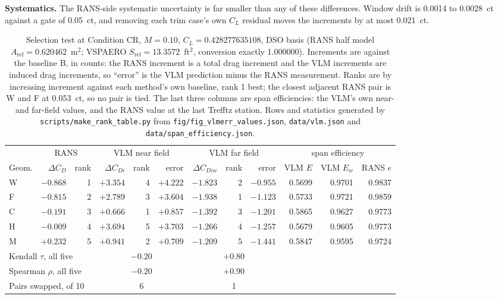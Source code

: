 \textbf{Systematics.} The RANS-side systematic uncertainty is far smaller than any of these
differences. Window drift is
0.0014 to 0.0028~ct against a gate of 0.05~ct, and removing each trim case's own $C_L$ residual
moves the increments by at most 0.021~ct.

\begin{table}[htbp]
  \centering
  \scriptsize
  \setlength{\tabcolsep}{3.5pt}
  \caption{Selection test at Condition CR, $M = 0.10$, $C_L = 0.428277635108$, DSO basis (RANS
  half model $A_\mathrm{ref} = 0.620462$~m$^2$; VSPAERO $S_\mathrm{ref} = 13.3572$~ft$^2$,
  conversion exactly 1.000000). Increments are against the baseline B, in counts: the RANS
  increment is a total drag increment and the VLM increments are induced drag increments, so
  ``error'' is the VLM prediction minus the RANS measurement. Ranks are by increasing increment
  against each method's own baseline, rank 1 best; the closest adjacent RANS pair is W and F at $0.053$~ct, so no pair is tied. The last
  three columns are span efficiencies: the VLM's own near- and far-field values, and the RANS
  value at the last Trefftz station. Rows and statistics generated by
  \texttt{scripts/make\_rank\_table.py} from \texttt{fig/fig\_vlmerr\_values.json},
  \texttt{data/vlm.json} and \texttt{data/span\_efficiency.json}.}
  \label{tab:lo:selection}
  \begin{tabular}{lrrrrrrrrrrr}
    \toprule
     & \multicolumn{2}{c}{RANS} & \multicolumn{3}{c}{VLM near field} &
       \multicolumn{3}{c}{VLM far field} & \multicolumn{3}{c}{span efficiency} \\
    \cmidrule(lr){2-3}\cmidrule(lr){4-6}\cmidrule(lr){7-9}\cmidrule(lr){10-12}
    Geom. & $\Delta C_D$ & rank & $\Delta C_{Di}$ & rank & error & $\Delta C_{Diw}$ & rank & error &
      VLM $E$ & VLM $E_w$ & RANS $e$ \\
    \midrule
    W & $-0.868$ & 1 & $+3.354$ & 4 & $+4.222$ & $-1.823$ & 2 & $-0.955$ & 0.5699 & 0.9701 & 0.9837 \\
    F & $-0.815$ & 2 & $+2.789$ & 3 & $+3.604$ & $-1.938$ & 1 & $-1.123$ & 0.5733 & 0.9721 & 0.9859 \\
    C & $-0.191$ & 3 & $+0.666$ & 1 & $+0.857$ & $-1.392$ & 3 & $-1.201$ & 0.5865 & 0.9627 & 0.9773 \\
    H & $-0.009$ & 4 & $+3.694$ & 5 & $+3.703$ & $-1.266$ & 4 & $-1.257$ & 0.5679 & 0.9605 & 0.9773 \\
    M & $+0.232$ & 5 & $+0.941$ & 2 & $+0.709$ & $-1.209$ & 5 & $-1.441$ & 0.5847 & 0.9595 & 0.9724 \\
    \midrule
    \multicolumn{3}{l}{Kendall $\tau$, all five}  & \multicolumn{3}{c}{$-0.20$} & \multicolumn{3}{c}{$+0.80$} & & & \\
    \multicolumn{3}{l}{Spearman $\rho$, all five} & \multicolumn{3}{c}{$-0.20$} & \multicolumn{3}{c}{$+0.90$} & & & \\
    \multicolumn{3}{l}{Pairs swapped, of 10}      & \multicolumn{3}{c}{6} & \multicolumn{3}{c}{1} & & & \\
    \bottomrule
  \end{tabular}
\end{table}

